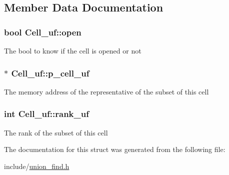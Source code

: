 \subsection{Member Data Documentation}
\hypertarget{structCell__uf_a9dd3368bae499fe43d1ecf976d278a92}{
\subsubsection[{open}]{\setlength{\rightskip}{0pt plus 5cm}bool Cell\-\_\-uf\-::open}}\label{structCell__uf_a9dd3368bae499fe43d1ecf976d278a92}
The bool to know if the cell is opened or not \hypertarget{structCell__uf_aea34c140208c634953b66842d148a1cb}{
\subsubsection[{p\-\_\-cell\-\_\-uf}]{$\ast$ Cell\-\_\-uf\-::p\-\_\-cell\-\_\-uf}}\label{structCell__uf_aea34c140208c634953b66842d148a1cb}
The memory address of the representative of the subset of this cell \hypertarget{structCell__uf_a272e6bb64ee809225211393bf813cb1e}{
\subsubsection[{rank\-\_\-uf}]{\setlength{\rightskip}{0pt plus 5cm}int Cell\-\_\-uf\-::rank\-\_\-uf}}\label{structCell__uf_a272e6bb64ee809225211393bf813cb1e}
The rank of the subset of this cell 

The documentation for this struct was generated from the following file\-:\begin{DoxyCompactItemize}
\item 
include/\hyperlink{union__find_8h}{union\-\_\-find.\-h}\end{DoxyCompactItemize}
